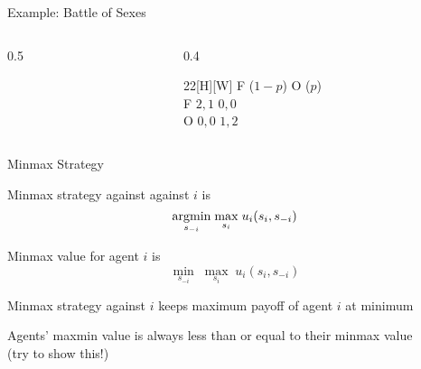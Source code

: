 \documentclass[11pt,aspectratio=169,handout]{beamer}
\begin{document}
\begin{frame}{Example: Battle of Sexes}
\begin{columns}
\begin{column}{0.5\textwidth}
\begin{center}
\begin{tikzpicture}
      \end{tikzpicture}
     \end{center}
    \end{column}   
    \begin{column}{0.4\textwidth}
     \hspace{-20pt}
     \vspace{-30pt}
     \begin{center}
      \begin{game}{2}{2}[H][W]
    		\> F ($1-p$)	\> O	 ($p$)\\
       F	\> $2,1$		\> $0,0$	\\
       O	\> $0,0$		\> $1,2$
      \end{game}
     \end{center}
    \end{column}
   \end{columns}
  \end{frame}

  \begin{frame}{Minmax Strategy}
   \begin{itemizes}
    \item \alert{Minmax strategy} against against $i$ is 
    $$\underset{s_{-i}}{\argmin} \; \underset{s_{i}}{\max} \; u_{i}(s_i,s_{-i})$$
    \item Minmax value for agent $i$ is 
    $$\underset{s_{-i}}{\min} \; \underset{s_{i}}{\max} \; u_{i}(s_i,s_{-i})$$
    \item Minmax strategy against $i$ keeps maximum payoff of agent $i$ at minimum    
    \item Agents' maxmin value is always less than or equal to their minmax value\\(try to show this!)
   \end{itemizes}
  \end{frame}
  
\end{document}
